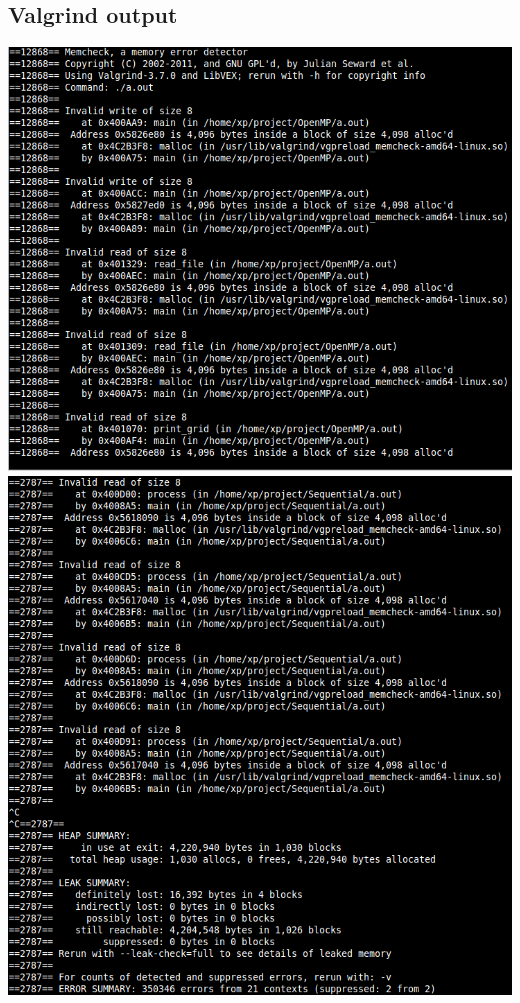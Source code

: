 \documentclass[11pt]{article} %
\begin{document}
\subsection{Valgrind output}
\includegraphics[scale=0.5]{valgrind1.png}\\
\includegraphics[scale=0.5]{valgrind2.png}
\pagebreak
\end{document}
